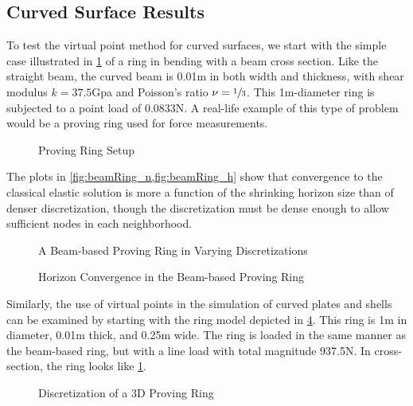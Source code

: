 \subsection{Curved Surface Results}
To test the virtual point method for curved surfaces, we start with the simple case illustrated in \cref{fig:ProvingRing} of a ring in bending with a beam cross section.
Like the straight beam, the curved beam is 0.01m in both width and thickness, with shear modulus $k=37.5$Gpa and Poisson's ratio $\nu = \sfrac{1}{3}$.
This 1m-diameter ring is subjected to a point load of 0.0833N.
A real-life example of this type of problem would be a proving ring used for force measurements.
%
\begin{figure}[tbhp]
  \centering
  
  \caption{Proving Ring Setup}
  \label{fig:ProvingRing}
\end{figure}
%
The plots in \cref{fig:beamRing_n,fig:beamRing_h} show that convergence to the classical elastic solution is more a function of the shrinking horizon size than of denser discretization, though the discretization must be dense enough to allow sufficient nodes in each neighborhood.
%
\begin{figure}[tbhp]
  \centering
  \resizebox{0.8\linewidth}{!}{}
  \caption{A Beam-based Proving Ring in Varying Discretizations}
  \label{fig:beamRing_n}
\end{figure}
%
%
\begin{figure}[tbhp]
  \centering
  \resizebox{0.8\linewidth}{!}{}
  \caption{Horizon Convergence in the Beam-based Proving Ring}
  \label{fig:beamRing_h}
\end{figure}
%

Similarly, the use of virtual points in the simulation of curved plates and shells can be examined by starting with the ring model depicted in \cref{fig:PlateRing}.
This ring is 1m in diameter, 0.01m thick, and 0.25m wide.
The ring is loaded in the same manner as the beam-based ring, but with a line load with total magnitude 937.5N.
In cross-section, the ring looks like \cref{fig:ProvingRing}.
%
\begin{figure}[tbhp]
  \centering
  \vspace{-35mm}
  \resizebox{0.9\linewidth}{!}{}
  \vspace{-35mm}
  \caption{Discretization of a 3D Proving Ring}
  \label{fig:PlateRing}
\end{figure}
%


